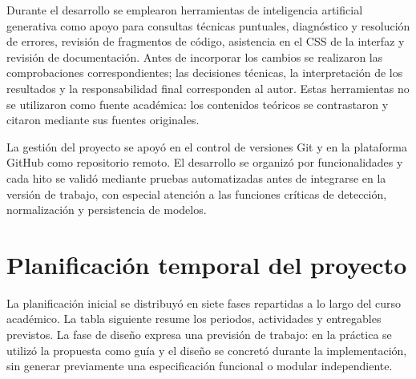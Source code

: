 \documentclass[11pt,a4paper,oneside]{report}
\begin{document}
Durante el desarrollo se emplearon herramientas de inteligencia artificial generativa como apoyo para consultas técnicas puntuales, diagnóstico y resolución de errores, revisión de fragmentos de código, asistencia en el CSS de la interfaz y revisión de documentación. Antes de incorporar los cambios se realizaron las comprobaciones correspondientes; las decisiones técnicas, la interpretación de los resultados y la responsabilidad final corresponden al autor. Estas herramientas no se utilizaron como fuente académica: los contenidos teóricos se contrastaron y citaron mediante sus fuentes originales.

La gestión del proyecto se apoyó en el control de versiones Git y en la plataforma GitHub como repositorio remoto. El desarrollo se organizó por funcionalidades y cada hito se validó mediante pruebas automatizadas antes de integrarse en la versión de trabajo, con especial atención a las funciones críticas de detección, normalización y persistencia de modelos.

\section{Planificación temporal del proyecto}

La planificación inicial se distribuyó en siete fases repartidas a lo largo del curso académico. La tabla siguiente resume los periodos, actividades y entregables previstos. La fase de diseño expresa una previsión de trabajo: en la práctica se utilizó la propuesta como guía y el diseño se concretó durante la implementación, sin generar previamente una especificación funcional o modular independiente.
\end{document}
